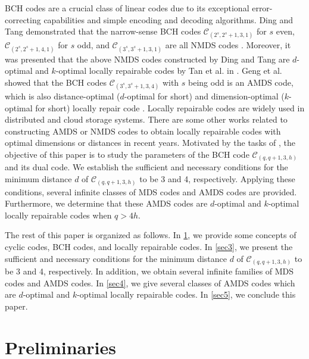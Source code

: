 \documentclass[10pt]{article}%
\begin{document}
	BCH codes are a crucial class of linear codes due to its exceptional error-correcting capabilities and simple encoding and decoding algorithms. Ding and Tang demonstrated that the narrow-sense BCH codes $\mathcal{C}_{(2^s,2^s+1,3,1)}$ for $s$ even, $\mathcal{C}_{(2^s,2^s+1,4,1)}$ for $s$ odd, and $\mathcal{C}_{(3^s,3^s+1,3,1)}$ are all NMDS codes \cite{Ding2020InfiniteFamiliesMDS,Tang2021InfiniteFamilyLinear}. Moreover, it was presented that the above NMDS codes constructed by Ding and Tang are $d$-optimal and $k$-optimal locally repairable codes by Tan et al. in \cite{Tan2023MinimumLocalityLinear}. Geng et al. showed that the BCH codes $\mathcal{C}_{(3^s,3^s+1,3,4)}$ with $s$ being odd is an AMDS code, which is also distance-optimal ($d$-optimal for short) and dimension-optimal ($k$-optimal for short) locally repair code \cite{Geng2022ClassAlmostMDS}. Locally repairable codes are widely used in distributed and cloud storage systems. There are some other works \cite{Li2023ConstructionsMDSCodes,Li2023ConstructionOptimalLocally,Heng2023MDSCodesDimension,Fu2023ConstructionSingletonTypeOptimal} related to constructing AMDS or NMDS codes to obtain locally repairable codes with optimal dimensions or distances in recent years. 
	Motivated by the tasks of \cite{Ding2020InfiniteFamiliesMDS,Geng2022ClassAlmostMDS}, the objective of this paper is to study the parameters of the BCH code $\mathcal{C}_{(q,q+1,3,h)}$ and its dual code. We establish the sufficient and necessary conditions for the minimum distance $d$ of $\mathcal{C}_{(q,q+1,3,h)}$ to be 3 and 4, respectively. Applying these conditions, several infinite classes of MDS codes and AMDS codes are provided. Furthermore, we determine that these AMDS codes are $d$-optimal and $k$-optimal locally repairable codes when $q>4h$.
	
	The rest of this paper is organized as follows. In \cref{sec2}, we provide some concepts of cyclic codes, BCH codes, and locally repairable codes. In \cref{sec3}, we present the sufficient and necessary conditions for the minimum distance $d$ of $\mathcal{C}_{(q,q+1,3,h)}$ to be 3 and 4, respectively. In addition, we obtain several infinite families of MDS codes and AMDS codes. In \cref{sec4}, we give several classes of AMDS codes which are $d$-optimal and $k$-optimal locally repairable codes. In \cref{sec5}, we conclude this paper.
	
	\section{Preliminaries}\label{sec2}
	
\end{document}
